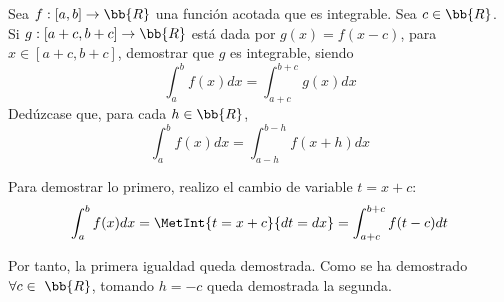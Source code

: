 \begin{ejercicio}
    Sea $f:[a,b]\to \bb{R}$ una función acotada que es integrable. Sea $c\in \bb{R}$. Si $g:[a+c,b+c]\to \bb{R}$ está dada por $g(x)=f(x-c)$, para $x\in [a+c,b+c]$, demostrar que $g$ es integrable, siendo
    \begin{equation*}
        \int_a^b f(x)dx = \int_{a+c}^{b+c}g(x)dx
    \end{equation*}
    Dedúzcase que, para cada $h\in \bb{R}$,
    \begin{equation*}
        \int_a^b f(x)dx = \int_{a-h}^{b-h}f(x+h)dx
    \end{equation*}


    Para demostrar lo primero, realizo el cambio de variable $t=x+c$:
    \begin{equation*}
        \int_a^b f(x)dx = \MetInt{t=x+c}{dt=dx} =
        \int_{a+c}^{b+c} f(t-c)dt
    \end{equation*}

    Por tanto, la primera igualdad queda demostrada. Como se ha demostrado $\forall c\in~\bb{R}$, tomando $h=-c$ queda demostrada la segunda.
\end{ejercicio}

